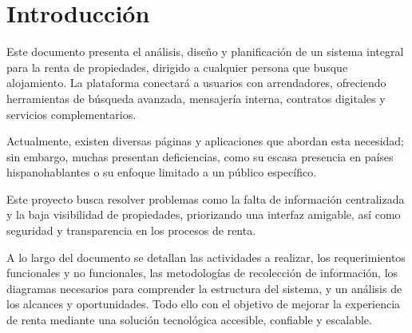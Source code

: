 \section{Introducción}
	\noindent Este documento presenta el análisis, diseño y planificación de un sistema integral para la renta de propiedades, dirigido a cualquier persona que busque alojamiento. La plataforma conectará a usuarios con arrendadores, ofreciendo herramientas de búsqueda avanzada, mensajería interna, contratos digitales y servicios complementarios.
	
	\noindent Actualmente, existen diversas páginas y aplicaciones que abordan esta necesidad; sin embargo, muchas presentan deficiencias, como su escasa presencia en países hispanohablantes o su enfoque limitado a un público específico.
	
	\noindent Este proyecto busca resolver problemas como la falta de información centralizada y la baja visibilidad de propiedades, priorizando una interfaz amigable, así como seguridad y transparencia en los procesos de renta.
	
	\noindent A lo largo del documento se detallan las actividades a realizar, los requerimientos funcionales y no funcionales, las metodologías de recolección de información, los diagramas necesarios para comprender la estructura del sistema, y un análisis de los alcances y oportunidades. Todo ello con el objetivo de mejorar la experiencia de renta mediante una solución tecnológica accesible, confiable y escalable.